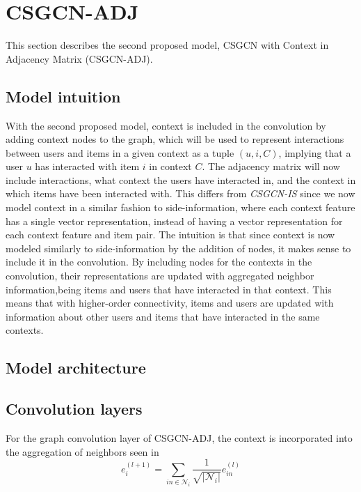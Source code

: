 \section{CSGCN-ADJ}\label{sec:csgcn_adj}
This section describes the second proposed model, CSGCN with Context in Adjacency Matrix (CSGCN-ADJ).

\subsection{Model intuition}\label{subsec:csgcn_adj_intuition}
With the second proposed model, context is included in the convolution by adding context nodes to the graph, which will be used to represent interactions between users and items in a given context as a tuple $(u,i,C)$, implying that a user $u$ has interacted with item $i$ in context $C$.
The adjacency matrix will now include interactions, what context the users have interacted in, and the context in which items have been interacted with.
This differs from \textit{CSGCN-IS} since we now model context in a similar fashion to side-information, where each context feature has a single vector representation, instead of having a vector representation for each context feature and item pair.
The intuition is that since context is now modeled similarly to side-information by the addition of nodes, it makes sense to include it in the convolution.
By including nodes for the contexts in the convolution, their representations are updated with aggregated neighbor information,being items and users that have interacted in that context.
This means that with higher-order connectivity, items and users are updated with information about other users and items that have interacted in the same contexts.

\subsection{Model architecture}\label{subsec:csgcn_adj_architecture}

\subsection{Convolution layers}\label{subsec:csgcn_adj_conv_layer}
For the graph convolution layer of CSGCN-ADJ, the context is incorporated into the aggregation of neighbors seen in 
\begin{equation}\label{eq:csgcn_adj_gc_layer_item}
    e_{i}^{(l+1)}=\sum_{in\in \mathcal{N}_{i}}\frac{1}{\sqrt{|\mathcal{N}_{i}|} }e_{in}^{(l)}
\end{equation}

